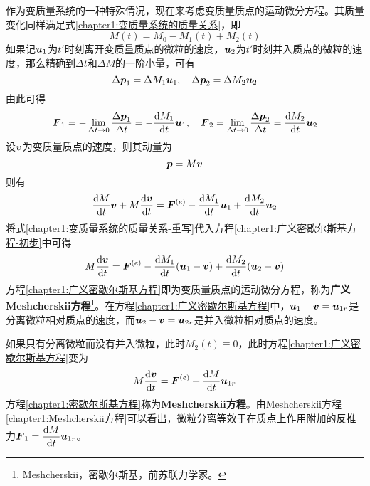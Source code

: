 作为变质量系统的一种特殊情况，现在来考虑变质量质点的运动微分方程。其质量变化同样满足式\eqref{chapter1:变质量系统的质量关系}，即
\begin{equation}
	M(t) = M_0 - M_1(t) + M_2(t)
	\label{chapter1:变质量系统的质量关系-重写}
\end{equation}
如果记$\boldsymbol{u}_1$为$t'$时刻离开变质量质点的微粒的速度，$\boldsymbol{u}_2$为$t'$时刻并入质点的微粒的速度，那么精确到$\Delta t$和$\Delta M$的一阶小量，可有
\begin{equation}
	\Delta \boldsymbol{p}_1 = \Delta M_1\boldsymbol{u}_1,\quad \Delta \boldsymbol{p}_2 = \Delta M_2\boldsymbol{u}_2
\end{equation}	
由此可得
\begin{equation}
	\boldsymbol{F}_1 = -\lim_{\Delta t\to 0} \frac{\Delta \boldsymbol{p}_1}{\Delta t} = -\dfrac{\mathrm{d} M_1}{\mathrm{d} t}\boldsymbol{u}_1,\quad \boldsymbol{F}_2 = \lim_{\Delta t\to 0} \frac{\Delta \boldsymbol{p}_2}{\Delta t} = \dfrac{\mathrm{d} M_2}{\mathrm{d} t}\boldsymbol{u}_2
\end{equation}
设$\boldsymbol{v}$为变质量质点的速度，则其动量为
\begin{equation}
	\boldsymbol{p} = M\boldsymbol{v}
\end{equation}
则有
\begin{equation}
	\dfrac{\mathrm{d} M}{\mathrm{d} t}\boldsymbol{v}+M\dfrac{\mathrm{d} \boldsymbol{v}}{\mathrm{d} t} = \boldsymbol{F}^{(e)} - \dfrac{\mathrm{d} M_1}{\mathrm{d} t}\boldsymbol{u}_1 + \dfrac{\mathrm{d} M_2}{\mathrm{d} t}\boldsymbol{u}_2
	\label{chapter1:广义密歇尔斯基方程-初步}
\end{equation}
将式\eqref{chapter1:变质量系统的质量关系-重写}代入方程\eqref{chapter1:广义密歇尔斯基方程-初步}中可得
\begin{equation}
	M\dfrac{\mathrm{d} \boldsymbol{v}}{\mathrm{d} t} = \boldsymbol{F}^{(e)} - \dfrac{\mathrm{d} M_1}{\mathrm{d} t}(\boldsymbol{u}_1-\boldsymbol{v}) + \dfrac{\mathrm{d} M_2}{\mathrm{d} t}(\boldsymbol{u}_2-\boldsymbol{v})
	\label{chapter1:广义密歇尔斯基方程}
\end{equation}
方程\eqref{chapter1:广义密歇尔斯基方程}即为变质量质点的运动微分方程，称为{\bf 广义Meshcherskii方程}\footnote{Meshcherskii，密歇尔斯基，前苏联力学家。}。在方程\eqref{chapter1:广义密歇尔斯基方程}中，$\boldsymbol{u}_1-\boldsymbol{v}=\boldsymbol{u}_{1r}$是分离微粒相对质点的速度，而$\boldsymbol{u}_2-\boldsymbol{v}=\boldsymbol{u}_{2r}$是并入微粒相对质点的速度。

如果只有分离微粒而没有并入微粒，此时$M_2(t)\equiv 0$，此时方程\eqref{chapter1:广义密歇尔斯基方程}变为
\begin{equation}
	M\dfrac{\mathrm{d} \boldsymbol{v}}{\mathrm{d} t} = \boldsymbol{F}^{(e)} + \dfrac{\mathrm{d} M}{\mathrm{d} t}\boldsymbol{u}_{1r}
	\label{chapter1:密歇尔斯基方程}
\end{equation}
方程\eqref{chapter1:密歇尔斯基方程}称为{\bf Meshcherskii方程}。由Meshcherskii方程\eqref{chapter1:Meshcherskii方程}可以看出，微粒分离等效于在质点上作用附加的反推力$\boldsymbol{F}_1 = \dfrac{\mathrm{d} M}{\mathrm{d} t}\boldsymbol{u}_{1r}$。

